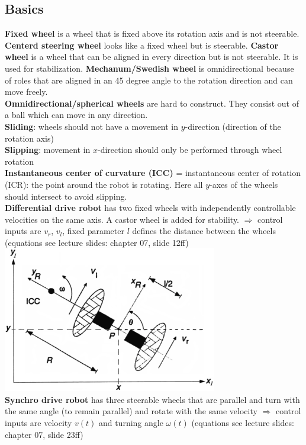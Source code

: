 \documentclass[12pt]{article}
\begin{document}
	\subsection{Basics}
	\textbf{Fixed wheel} is a wheel that is fixed above its rotation axis and is not steerable.
	\textbf{Centerd steering wheel} looks like a fixed wheel but is steerable.
	\textbf{Castor wheel} is a wheel that can be aligned in every direction but is not steerable. It is used for stabilization.
	\textbf{Mechanum/Swedish wheel} is omnidirectional because of roles that are aligned in an 45 degree angle to the rotation direction and can move freely.\\
	\textbf{Omnidirectional/spherical wheels} are hard to construct. They consist out of a ball which can move in any direction.\\
	\textbf{Sliding}: wheels should not have a movement in $y$-direction (direction of the rotation axis)\\
	\textbf{Slipping}: movement in $x$-direction should only be performed through wheel rotation\\
	\textbf{Instantaneous center of curvature (ICC)} = instantaneous center of rotation (ICR): the point around the robot is rotating. Here all $y$-axes of the wheels should intersect to avoid slipping.\\
	\textbf{Differential drive robot} has two fixed wheels with independently controllable velocities on the same axis. A castor wheel is added for stability. $\Rightarrow$ control inputs are $v_r$, $v_l$, fixed parameter $l$ defines the distance between the wheels (equations see lecture slides: chapter 07, slide 12ff)\\
	\includegraphics[width=0.7\textwidth]{figures/differential-drive-robot.png}\\
	\textbf{Synchro drive robot} has three steerable wheels that are parallel and turn with the same angle (to remain parallel) and rotate with the same velocity $\Rightarrow$ control inputs are velocity $v(t)$ and turning angle $\omega(t)$ (equations see lecture slides: chapter 07, slide 23ff)\\
\end{document}
